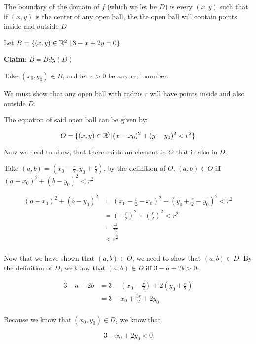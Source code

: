 \documentclass[12pt]{article} %
\begin{document}
\begin{homeworkProblem}
    The boundary of the domain of $f$ (which we let be $D$) is every $(x, y)$ such that if $(x, y)$ is the center of any open ball, the the open ball will
    contain points inside and outside $D$

    Let $B = \{(x, y) \in \mathbb{R}^2 \mid 3 - x + 2y = 0\}$

    \textbf{Claim}: $B = Bdy(D)$

    Take $(x_0, y_0) \in B$, and let $r > 0$ be any real number.

    We must show that any open ball with radius $r$ will have points inside and also outside $D$.

    The equation of said open ball can be given by:

    $$
        O = \{(x, y) \in \mathbb{R}^2 | (x - x_0)^2 + (y - y_0)^2 < r^2\}
    $$

    Now we need to show, that there exists an element in $O$ that is also in $D$.

    Take $(a,b) = (x_0 - \frac{r}{2}, y_0 + \frac{r}{2})$, by the definition of $O$, $(a, b) \in O$ iff $(a - x_0)^2 + (b - y_0)^2 < r^2$

    \begin{align*}
        (a - x_0)^2 + (b - y_0)^2
         & = (x_0 - \frac{r}{2} - x_0)^2 + (y_0 + \frac{r}{2} - y_0)^2 < r^2 \\
         & = (-\frac{r}{2})^2 + (\frac{r}{2})^2 < r^2                        \\
         & = \frac{r^2}{2}                                                   \\
         & < r^2                                                             \\
    \end{align*}

    Now that we have shown that $(a, b) \in O$, we need to show that $(a, b) \in D$.
    By the definition of $D$, we know that $(a, b) \in D$ iff $3 - a + 2b > 0$.

    \begin{align*}
        3 - a + 2b
         & = 3 - (x_0 - \frac{r}{2}) + 2(y_0 + \frac{r}{2}) \\
         & =  3 - x_0 + \frac{3r}{2} + 2y_0                 \\
    \end{align*}

    Because we know that $(x_0, y_0) \in D$, we know that

    $$
        3 - x_0 + 2y_0 < 0
    $$


\end{homeworkProblem}
\end{document}
